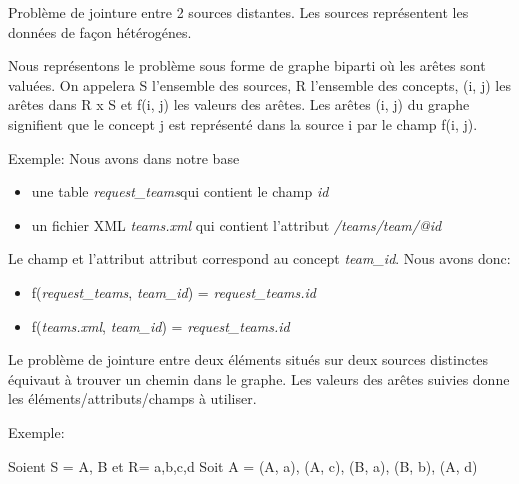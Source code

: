 Problème de jointure entre 2 sources distantes.
Les sources représentent les données de façon hétérogénes.


Nous représentons le problème sous forme de graphe biparti où les arêtes sont valuées.
On appelera S l'ensemble des sources, R l'ensemble des concepts, (i, j) les arêtes dans R x S et f(i, j) les valeurs des arêtes.
Les arêtes (i, j) du graphe signifient que le concept j est représenté dans la source i par le champ f(i, j).

Exemple:
Nous avons dans notre base
\begin{itemize}
	\item une table \textit{request\_teams}qui contient le champ \textit{id}
	\item un fichier XML \textit{teams.xml} qui contient l'attribut \textit{/teams/team/@id}
\end{itemize}
Le champ et l'attribut attribut correspond au concept \textit{team_id}. Nous avons donc:
\begin{itemize}
	\item f(\textit{request\_teams}, \textit{team_id}) = \textit{request\_teams.id}
	\item f(\textit{teams.xml}, \textit{team_id}) = \textit{request\_teams.id}
\end{itemize} 

Le problème de jointure entre deux éléments situés sur deux sources distinctes équivaut à trouver un chemin dans le graphe. Les valeurs des arêtes suivies donne les éléments/attributs/champs à utiliser.

Exemple:

Soient S = {A, B} et R= {a,b,c,d}
Soit A = {(A, a), (A, c), (B, a), (B, b), (A, d)}

